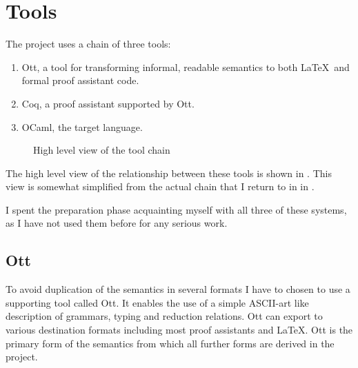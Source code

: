 \documentclass[12pt,twoside,notitlepage]{report}
\theoremstyle{plain}%
\theoremstyle{definition}
\theoremstyle{remark}
\begin{document}
\section{Tools}
The project uses a chain of three tools: \begin{enumerate}
\item{
Ott, a tool for transforming informal, readable semantics to both \LaTeX\, and formal proof assistant code.}
\item{Coq, a proof assistant supported by Ott. }
\item{OCaml, the target language. }
\end{enumerate}

\begin{figure}[h!]
\centering
{}
\caption{High level view of the tool chain}
\label{fig:simpl_toolchain}
\end{figure}

The high level view of the relationship between these tools is shown in . This view is somewhat simplified from the actual chain that I return to in  in .

I spent the preparation phase acquainting myself with all three of these systems, as I have not used them before for any serious work.
\subsection{Ott}
To avoid duplication of the semantics in several formats I have to chosen to use a supporting tool called Ott\cite{Ott}. It enables the use of a simple ASCII-art like description of grammars, typing and reduction relations. Ott can export to various destination formats including most proof assistants and \LaTeX. Ott  is the primary form of the semantics from which all further forms are derived in the project.
\end{document}
